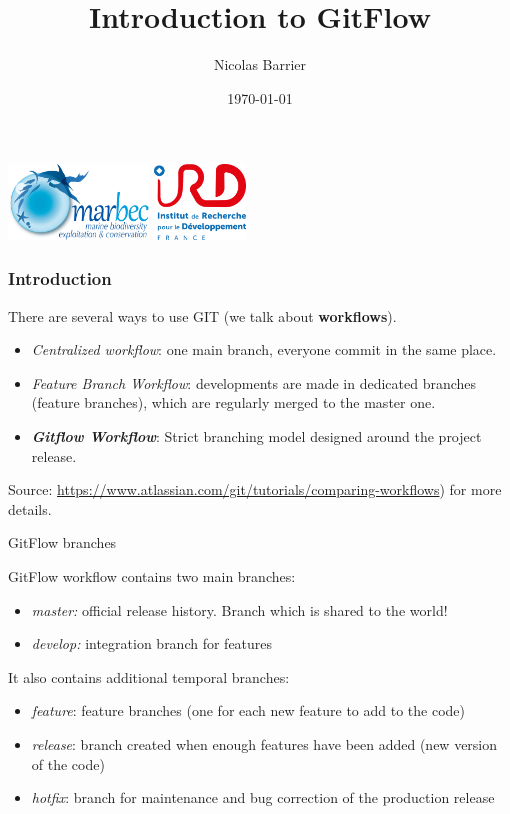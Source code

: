 \documentclass{beamer}
\title[Introduction to GitFlow]{Introduction to GitFlow} %
\author{Nicolas Barrier} %
\institute[UMR MARBEC] %
{
UMR MARBEC \\ %
\medskip
\textit{nicolas.barrier@ird.fr} %
}
\date{\today} %
\begin{document}
\begin{frame}
\titlepage %
\begin{center}
\includegraphics[height=2cm]{logo-marbec.png}
\hspace{1em}
\includegraphics[height=2cm]{logo_ird.png}
\end{center}
\end{frame}

\begin{frame}
\frametitle{Introduction} %
There are several ways to use GIT (we talk about \textbf{workflows}). 

\begin{itemize}
    \item \emph{Centralized workflow}: one main branch, everyone commit in the same place.
    \item \emph{Feature Branch Workflow}: developments are made in dedicated branches (feature branches), which are regularly merged to the master one.
    \item \textbf{\textit{Gitflow Workflow}}: Strict branching model designed around the project release.
\end{itemize}

Source: \url{https://www.atlassian.com/git/tutorials/comparing-workflows}) for more details.

\end{frame}

\begin{frame}{GitFlow branches}

GitFlow workflow contains two main branches:
\begin{itemize}
\item{\emph{master:} official release history. Branch which is shared to the world!}
\item{\emph{develop:} integration branch for features}
\end{itemize}

It also contains additional temporal branches:
\begin{itemize}
\item{\emph{feature}: feature branches (one for each new feature to add to the code)}
\item{\emph{release}: branch created when enough features have been added (new version of the code)}
\item{\emph{hotfix}: branch for maintenance and bug correction of the production release}
\end{itemize}

\end{frame}
\end{document}
